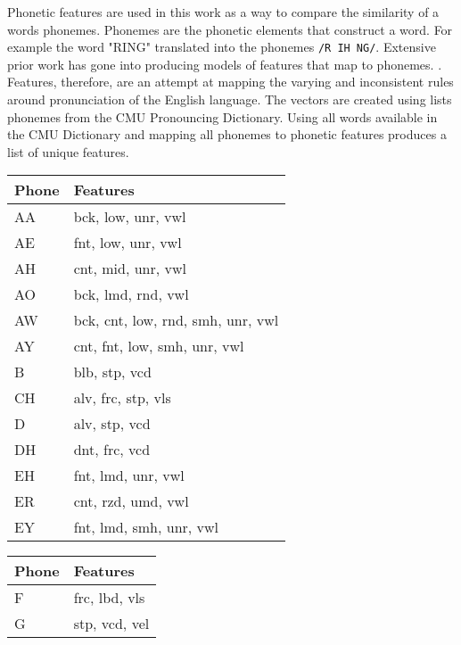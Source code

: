 Phonetic features are used in this work as a way to compare the similarity of a words phonemes. Phonemes are the phonetic elements that construct a word. For example the word "RING" translated into the phonemes \verb|/R IH NG/|. Extensive prior work has gone into producing models of features that map to phonemes. \cite{chomsky1968sound}\cite{ladefoged1969measurement}\cite{bradlow2010perceptual}. Features, therefore, are an attempt at mapping the varying and inconsistent rules around pronunciation of the English language. The vectors are created using lists phonemes from the CMU Pronouncing Dictionary. Using all words available in the CMU Dictionary and mapping all phonemes to phonetic features produces a list of unique features.

\begin{table}[!htb]
    \tiny
    \begin{minipage}{.33\linewidth}
        \centering
        \begin{tabular}{ll}
            Phone & Features \\
            \hline
            AA & bck, low, unr, vwl \\
            AE & fnt, low, unr, vwl \\
            AH & cnt, mid, unr, vwl \\
            AO & bck, lmd, rnd, vwl \\
            AW & bck, cnt, low, rnd, smh, unr, vwl \\
            AY & cnt, fnt, low, smh, unr, vwl \\
            B & blb, stp, vcd \\
            CH & alv, frc, stp, vls \\
            D & alv, stp, vcd \\
            DH & dnt, frc, vcd \\
            EH & fnt, lmd, unr, vwl \\
            ER & cnt, rzd, umd, vwl \\
            EY & fnt, lmd, smh, unr, vwl
        \end{tabular}
    \end{minipage}%
    \begin{minipage}{.33\linewidth}
        \centering
        \begin{tabular}{ll}
            Phone & Features \\
            \hline
            F &  frc, lbd, vls \\
            G &  stp, vcd, vel \\

\end{tabular}
\end{minipage}
\end{table}
